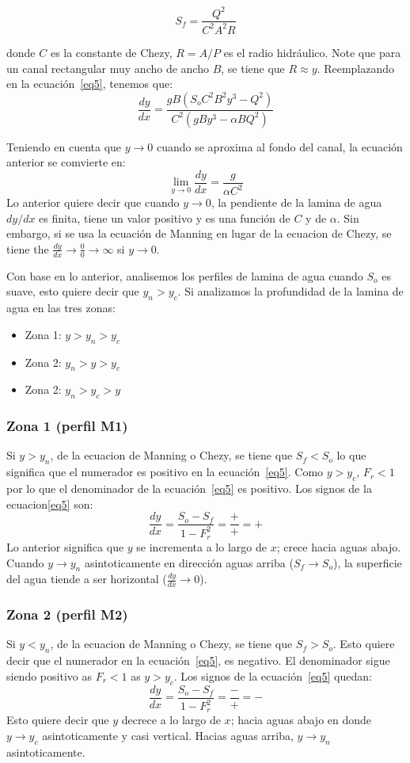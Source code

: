 \documentclass[11pt, oneside]{article}
\begin{document}
$$
S_f = \frac{Q^2}{C^2 A^2 R}
$$

donde $C$ es la constante de Chezy, $R= A/P$ es el radio hidr\'aulico. Note que para un canal rectangular muy ancho de ancho $B$, se tiene que $R \approx y$. Reemplazando en la ecuaci\'on~\ref{eq5}, tenemos que:
$$
\frac{dy}{dx} = \frac{gB \left(S_o C^2 B^2 y^3 - Q^2\right)}{C^2 \left(gBy^3 -\alpha B Q^2\right)}
$$

Teniendo en cuenta que $y\rightarrow 0$ cuando se aproxima al fondo del canal, la ecuaci\'on anterior se comvierte en:
$$
\lim_{y \to 0} \frac{dy}{dx} = \frac{g}{\alpha C^2}
$$
Lo anterior quiere decir que cuando $y \rightarrow 0$, la pendiente de la lamina de agua $dy/dx$ es finita, tiene un valor positivo y es una funci\'on de $C$ y de $\alpha$. Sin embargo, si se usa la ecuaci\'on de Manning en lugar de la ecuacion de Chezy, se tiene the $\frac{dy}{dx} \rightarrow \frac{0}{0} \rightarrow \infty$ si $y \rightarrow 0$.

Con base en lo anterior, analisemos los perfiles de lamina de agua cuando $S_o$ es suave, esto quiere decir que $y_n > y_c$. Si analizamos la profundidad de la lamina de agua en las tres zonas:
\begin{itemize}
    \item Zona 1: $y > y_n > y_c$
    \item Zona 2: $y_n > y > y_c$
    \item Zona 2: $y_n > y_c > y$
\end{itemize}

\subsubsection*{Zona 1 (perfil M1)}
Si $y > y_n$, de la ecuacion de Manning o Chezy, se tiene que $S_f < S_o$ lo que significa que el numerador es positivo  en la ecuaci\'on~\ref{eq5}. Como $y > y_c$, $F_r < 1$ por lo que el denominador de la ecuaci\'on~\ref{eq5} es positivo. Los signos de la ecuacion\ref{eq5} son:
$$
\frac{dy}{dx} = \frac{S_o - S_f}{1-F_r^2} = \frac{+}{+} = +
$$
Lo anterior significa que $y$ se incrementa a lo largo de $x$; crece hacia aguas abajo.  Cuando $y \rightarrow y_n$ asintoticamente en direcci\'on aguas arriba ($S_f \rightarrow S_o$), la superficie del agua tiende a ser horizontal ($\frac{dy}{dx}\rightarrow 0$).  

\subsubsection*{Zona 2 (perfil M2)}
Si $y < y_n$, de la ecuacion de Manning o Chezy, se tiene que $S_f > S_o$. Esto quiere decir que el numerador en la ecuaci\'on~\ref{eq5}, es negativo. El denominador sigue siendo positivo as $F_r < 1$ as $y > y_c$. Los signos de la ecuaci\'on~\ref{eq5} quedan:
$$
\frac{dy}{dx} = \frac{S_o - S_f}{1-F_r^2} = \frac{-}{+} = -
$$
Esto quiere decir que $y$ decrece a lo largo de $x$; hacia aguas abajo en donde $y \rightarrow y_c$ asintoticamente y casi vertical. Hacias aguas arriba, $y \rightarrow y_n$ asintoticamente.
\end{document}
